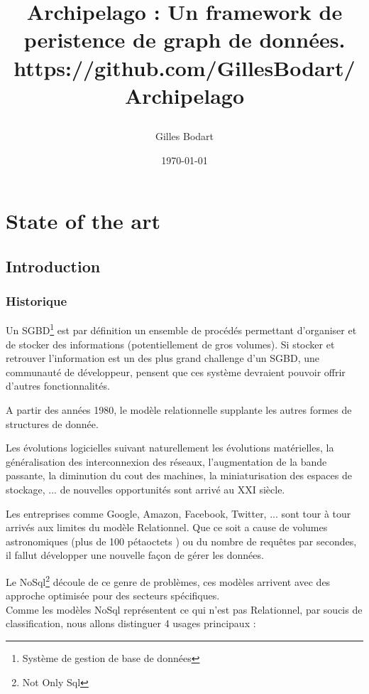 \documentclass[a4paper,12pt,twoside, fleqn]{report}
\author{Gilles Bodart}
\date{\today}
\title{%
    \begin{minipage}\linewidth
        \centering\bfseries\sffamily
        Archipelago : Un framework de peristence de graph de données.
        \vskip4pt
        \large https://github.com/GillesBodart/Archipelago
    \end{minipage}
}
\begin{document}
\maketitle
\tableofcontents
\part{State of the art}
\chapter{Introduction}

\section{Historique}  

Un SGBD\footnote{Système de gestion de base de données} est par définition un ensemble de procédés permettant d'organiser et de stocker des informations (potentiellement de gros volumes). Si stocker et retrouver l'information est un des plus grand challenge d'un SGBD, une communauté de développeur, pensent que ces système devraient pouvoir offrir d'autres fonctionnalités. 

A partir des années 1980, le modèle relationnelle supplante les autres formes de structures de donnée.

Les évolutions logicielles suivant naturellement les évolutions matérielles, la généralisation des interconnexion des réseaux, l'augmentation de la bande passante, la diminution du cout des machines, la miniaturisation des espaces de stockage, ... de nouvelles opportunités sont arrivé au XXI siècle.

Les entreprises comme Google, Amazon, Facebook, Twitter, ... sont tour à tour arrivés aux limites du modèle Relationnel. Que ce soit a cause de volumes astronomiques (plus de 100 pétaoctets ) ou du nombre de requêtes par secondes, il fallut développer une nouvelle façon de gérer les données.

Le NoSql\footnote{Not Only Sql} découle de ce genre de problèmes, ces modèles arrivent avec des approche optimisée pour des secteurs spécifiques. \\
Comme les modèles NoSql représentent ce qui n'est pas Relationnel, par soucis de classification, nous allons distinguer 4 usages principaux :
\end{document}

